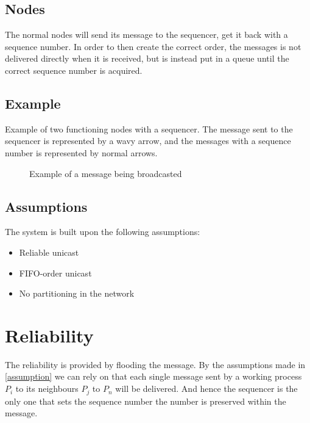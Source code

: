 \documentclass{article}
\begin{document}
 \subsection{Nodes}
 The normal nodes will send its message to the sequencer, get it back with a sequence number.
 In order to then create the correct order, the messages is not delivered directly when
 it is received, but is instead put in a queue until the correct sequence number is acquired.\\
 \subsection{Example}
 Example of two functioning nodes with a sequencer. The message sent to the sequencer is 
 represented by a wavy arrow, and the messages with a sequence number is represented by normal
 arrows.
  \begin{figure}[h]
    \centering
    \caption{Example of a message being broadcasted}
    \label{fig1}
  \end{figure}
  
  \subsection{Assumptions}
  The system is built upon the following assumptions:
  \label{assumption}
  \begin{itemize}
  \item Reliable unicast
  \item FIFO-order unicast
  \item No partitioning in the network
  \end{itemize}  

\section{Reliability} 
  \label{reliability}
  The reliability is provided by flooding the message. By the assumptions made in \ref{assumption} we can rely on 
  that each single message sent by a working process $P_i$ to its neighbours $P_j$ to $P_n$ will be delivered.
  And hence the sequencer is the only one that sets the sequence number the number is preserved within the message.
  
\end{document}
